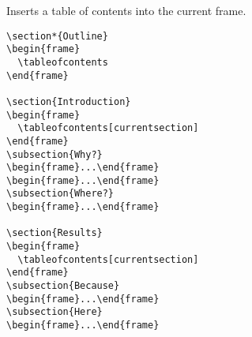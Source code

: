 \begin{command}{\tableofcontents{}}
  Inserts a table of contents into the current frame.

  \example
\begin{verbatim}
\section*{Outline}
\begin{frame}
  \tableofcontents
\end{frame}

\section{Introduction}
\begin{frame}
  \tableofcontents[currentsection]
\end{frame}
\subsection{Why?}
\begin{frame}...\end{frame}
\begin{frame}...\end{frame}
\subsection{Where?}
\begin{frame}...\end{frame}

\section{Results}
\begin{frame}
  \tableofcontents[currentsection]
\end{frame}
\subsection{Because}
\begin{frame}...\end{frame}
\subsection{Here}
\begin{frame}...\end{frame}
\end{verbatim}


\end{command}
